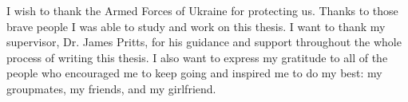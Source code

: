 \documentclass[
11pt, %
english, %
singlespacing, %
headsepline, %
openany
]{MastersDoctoralThesis} %
\begin{document}
\begin{abstract}
\end{abstract}


\begin{acknowledgements}
	\addchaptertocentry{\acknowledgementname} %
	I wish to thank the Armed Forces of Ukraine for protecting us. Thanks to those
	brave people I was able to study and work on this thesis. I want to thank my
	supervisor, Dr. James Pritts, for his guidance and support throughout the whole
	process of writing this thesis. I also want to express my gratitude to all of
	the people who encouraged me to keep going and inspired me to do my best: my
	groupmates, my friends, and my girlfriend.

\end{acknowledgements}


\tableofcontents %
%
%

\end{document}
